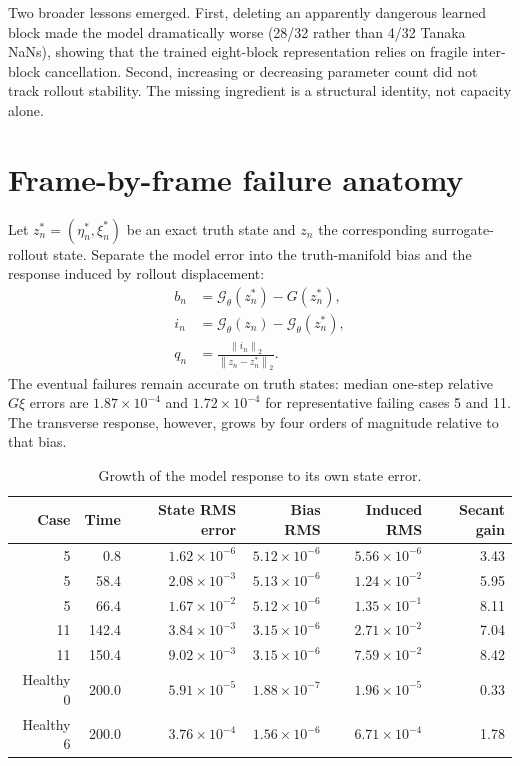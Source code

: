 \documentclass[11pt]{article}
\newcommand{\Gt}{\mathcal{G}_{\theta}}
\newcommand{\norm}[1]{\left\lVert #1\right\rVert}
\begin{document}
Two broader lessons emerged.  First, deleting an apparently dangerous learned
block made the model dramatically worse (28/32 rather than 4/32 Tanaka NaNs),
showing that the trained eight-block representation relies on fragile
inter-block cancellation.  Second, increasing or decreasing parameter count
did not track rollout stability.  The missing ingredient is a structural
identity, not capacity alone.

\section{Frame-by-frame failure anatomy}

Let \(z_n^*=(\eta_n^*,\xi_n^*)\) be an exact truth state and \(z_n\) the
corresponding surrogate-rollout state.  Separate the model error into the
truth-manifold bias and the response induced by rollout displacement:
\begin{align}
 b_n &= \Gt(z_n^*)-G(z_n^*), \\
 i_n &= \Gt(z_n)-\Gt(z_n^*), \\
 q_n &= \frac{\norm{i_n}_2}{\norm{z_n-z_n^*}_2}.
\end{align}
The eventual failures remain accurate on truth states: median one-step
relative \(G\xi\) errors are \(1.87\times10^{-4}\) and
\(1.72\times10^{-4}\) for representative failing cases 5 and 11.  The
transverse response, however, grows by four orders of magnitude relative to
that bias.

\begin{table}[ht]
\centering
\small
\begin{tabular}{rrrrrr}
\toprule
Case & Time & State RMS error & Bias RMS & Induced RMS & Secant gain \\
\midrule
5  & 0.8   & $1.62\times10^{-6}$ & $5.12\times10^{-6}$ & $5.56\times10^{-6}$ & 3.43 \\
5  & 58.4  & $2.08\times10^{-3}$ & $5.13\times10^{-6}$ & $1.24\times10^{-2}$ & 5.95 \\
5  & 66.4  & $1.67\times10^{-2}$ & $5.12\times10^{-6}$ & $1.35\times10^{-1}$ & 8.11 \\
11 & 142.4 & $3.84\times10^{-3}$ & $3.15\times10^{-6}$ & $2.71\times10^{-2}$ & 7.04 \\
11 & 150.4 & $9.02\times10^{-3}$ & $3.15\times10^{-6}$ & $7.59\times10^{-2}$ & 8.42 \\
Healthy 0 & 200.0 & $5.91\times10^{-5}$ & $1.88\times10^{-7}$ & $1.96\times10^{-5}$ & 0.33 \\
Healthy 6 & 200.0 & $3.76\times10^{-4}$ & $1.56\times10^{-6}$ & $6.71\times10^{-4}$ & 1.78 \\
\bottomrule
\end{tabular}
\caption{Growth of the model response to its own state error.}
\label{tab:secant}
\end{table}
\end{document}
